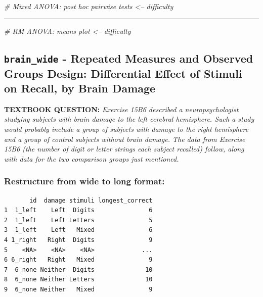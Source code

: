 \documentclass[
]{article}
\newenvironment{Shaded}{\begin{snugshade}}{\end{snugshade}}
\newcommand{\CommentTok}[1]{\textcolor[rgb]{0.56,0.35,0.01}{\textit{#1}}}
\begin{document}
\begin{Shaded}
\begin{Highlighting}[]
\CommentTok{# Mixed ANOVA: post hoc pairwise tests <-- difficulty}
\end{Highlighting}
\end{Shaded}

\begin{center}\rule{0.5\linewidth}{\linethickness}\end{center}

\begin{Shaded}
\begin{Highlighting}[]
\CommentTok{# RM ANOVA: means plot <-- difficulty}
\end{Highlighting}
\end{Shaded}

\clearpage

\hypertarget{brain_wide---repeated-measures-and-observed-groups-design-differential-effect-of-stimuli-on-recall-by-brain-damage}{%
\subsection{\texorpdfstring{\texttt{brain\_wide} - Repeated Measures and
Observed Groups Design: Differential Effect of Stimuli on Recall, by
Brain
Damage}{brain\_wide - Repeated Measures and Observed Groups Design: Differential Effect of Stimuli on Recall, by Brain Damage}}\label{brain_wide---repeated-measures-and-observed-groups-design-differential-effect-of-stimuli-on-recall-by-brain-damage}}

\textbf{TEXTBOOK QUESTION:} \emph{Exercise 15B6 described a
neuropsychologist studying subjects with brain damage to the left
cerebral hemisphere. Such a study would probably include a group of
subjects with damage to the right hemisphere and a group of control
subjects without brain damage. The data from Exercise 15B6 (the number
of digit or letter strings each subject recalled) follow, along with
data for the two comparison groups just mentioned.}

\hypertarget{restructure-from-wide-to-long-format-2}{%
\subsubsection{Restructure from wide to long
format:}\label{restructure-from-wide-to-long-format-2}}

\begin{verbatim}
       id  damage stimuli longest_correct
1  1_left    Left  Digits               6
2  1_left    Left Letters               5
3  1_left    Left   Mixed               6
4 1_right   Right  Digits               9
5    <NA>    <NA>    <NA>             ...
6 6_right   Right   Mixed               9
7  6_none Neither  Digits              10
8  6_none Neither Letters              10
9  6_none Neither   Mixed               9
\end{verbatim}
\end{document}
